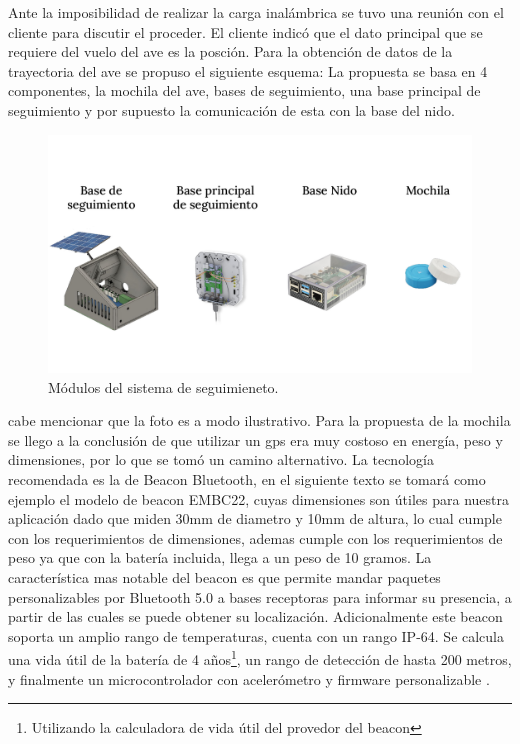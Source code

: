 Ante la imposibilidad de realizar la carga inalámbrica se tuvo una reunión con el cliente para discutir el proceder. El cliente indicó que el dato principal que se requiere del vuelo del ave es la posción.
Para la obtención de datos de la trayectoria del ave se propuso el siguiente esquema:
La propuesta se basa en 4 componentes, la mochila del ave, bases de seguimiento, una base principal de seguimiento y por supuesto la comunicación de esta con la base del nido.
\begin{figure}[H]
	\centering
	\includegraphics[width=\linewidth,page=1]{ImagenesFactibilidad/beacon}
	\caption{Módulos del sistema de seguimieneto.}
	\label{fig:componentes beacon}
\end{figure}
cabe mencionar que la foto es a modo ilustrativo.
Para la propuesta de la mochila se llego a la conclusión de que utilizar un gps era muy costoso en energía, peso y dimensiones, por lo que se tomó un camino alternativo.
La tecnología recomendada es la de Beacon Bluetooth, en el siguiente texto se tomará como ejemplo el modelo de beacon EMBC22, cuyas dimensiones son útiles para nuestra aplicación dado que miden 30mm de diametro y 10mm de altura, lo cual cumple con los requerimientos de dimensiones, ademas cumple con los requerimientos de peso ya que con la batería incluida, llega a un peso de 10 gramos. La característica mas notable del beacon es que permite mandar paquetes personalizables por Bluetooth 5.0 a bases receptoras para informar su presencia, a partir de las cuales se puede obtener su localización.
Adicionalmente este beacon soporta un amplio rango de temperaturas, cuenta con un rango IP-64. Se calcula una vida útil de la batería de 4 años\footnote{Utilizando la calculadora de vida útil del provedor del beacon}, un rango de detección de hasta 200 metros, y finalmente un microcontrolador con acelerómetro y firmware personalizable .
